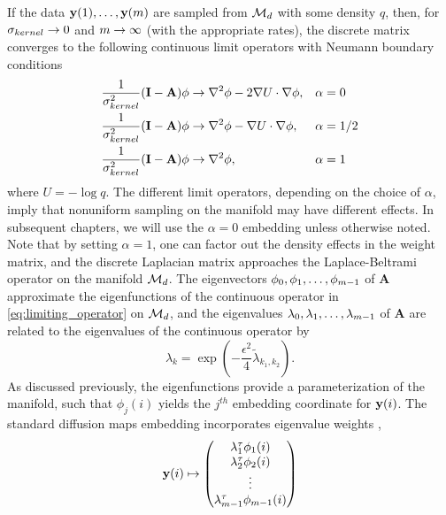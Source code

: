 If the data $\mathbf{y}(1), \dots, \mathbf{y}(m)$ are sampled from $\mathcal{M}_d$ with some density $q$, then, for $\sigma_{kernel} \rightarrow 0$ and $m \rightarrow \infty$ (with the appropriate rates), the discrete matrix converges to the following continuous limit operators with Neumann boundary conditions \cite{coifman2006geometric}
\begin{equation} \label{eq:limiting_operator}
\begin{aligned}
\frac{1}{\sigma_{kernel}^2}(\mathbf{I}-\mathbf{A}) \phi &\rightarrow \nabla^2 \phi - 2\nabla U \cdot \nabla \phi, &&\alpha = 0 \\
\frac{1}{\sigma_{kernel}^2}(\mathbf{I}-\mathbf{A}) \phi &\rightarrow \nabla^2 \phi - \nabla U \cdot \nabla \phi, &&\alpha = 1/2 \\
\frac{1}{\sigma_{kernel}^2}(\mathbf{I}-\mathbf{A}) \phi &\rightarrow \nabla^2 \phi, &&\alpha = 1
\end{aligned}
\end{equation}
where $U = - \log q$.
%
The different limit operators, depending on the choice of $\alpha$, imply that nonuniform sampling on the manifold may have different effects.
%
In subsequent chapters, we will use the $\alpha=0$ embedding unless otherwise noted.
%
Note that by setting $\alpha=1$, one can factor out the density effects in the weight matrix, and the discrete Laplacian matrix approaches the Laplace-Beltrami operator on the manifold $\mathcal{M}_d$.
%
The eigenvectors $\phi_0, \phi_1, \dots, \phi_{m-1}$ of $\mathbf{A}$ approximate the eigenfunctions of the continuous operator in \eqref{eq:limiting_operator} on $\mathcal{M}_d$,
and the eigenvalues $\lambda_0, \lambda_1, \dots, \lambda_{m-1}$ of $\mathbf{A}$ are related to the eigenvalues of the continuous operator by
\begin{equation} \label{eq:evals_relationship}
\lambda_k = \exp \left( -\frac{\epsilon^2}{4} \tilde{\lambda}_{k_1, k_2}  \right).
\end{equation}
%
As discussed previously, the eigenfunctions provide a parameterization of the manifold, such that $\phi_{j}(i)$ yields the $j^{th}$ embedding coordinate for $\mathbf{y}(i)$.
%
The standard diffusion maps embedding incorporates eigenvalue weights \cite{coifman2005geometric, coifman2006geometric},
%
\begin{equation} \label{eq:dmaps_embed_full}
\mathbf{y}(i) \mapsto
\begin{pmatrix}
\lambda_1^\tau \phi_1(i) \\
\lambda_2^\tau \phi_2(i) \\
\vdots \\
\lambda_{m-1}^\tau  \phi_{m-1}(i)
\end{pmatrix}
\end{equation}
